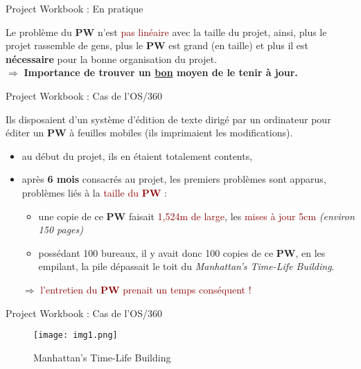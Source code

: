 \documentclass{beamer}
\newcommand{\red}[1]{\textcolor{darkred}{#1}}
\begin{document}
\begin{frame}{Project Workbook : En pratique}

Le problème du \textbf{PW} n'est \red{pas linéaire} avec la taille du projet, ainsi, plus le projet rassemble de gens, plus le 
\textbf{PW} est grand (en taille) et plus il est \textbf{nécessaire} pour la bonne organisation du projet.\\
$ $\\
$\Rightarrow$ \textbf{Importance de trouver un \underline{bon} moyen de le tenir à jour.}

\end{frame}

\begin{frame}{Project Workbook : Cas de l'OS/360}

Ils disposaient d'un système d'édition de texte dirigé par un ordinateur pour éditer un \textbf{PW} à feuilles mobiles (ils 
imprimaient les modifications). 
\begin{itemize}
\pause \item au début du projet, ils en étaient totalement contents,
\pause \item après \textbf{6 mois} consacrés au projet, les premiers problèmes sont apparus, problèmes liés à la \red{taille du 
\textbf{PW}} :
\begin{itemize}
\pause \item une copie de ce \textbf{PW} faisait \red{1,524m de large}, les \red{mises à jour 5cm} \textit{(environ 150 pages)}
\pause \item possédant 100 bureaux, il y avait donc 100 copies de ce \textbf{PW}, en les empilant, la pile dépassait le toit du
\textit{Manhattan's Time-Life Building}.
\end{itemize}
$\Rightarrow$ \red{l'entretien du \textbf{PW} prenait un temps conséquent !}
\end{itemize}

\end{frame}

\begin{frame}{Project Workbook : Cas de l'OS/360}

\begin{figure}
	\begin{center}
	\texttt{[image: img1.png]}
	\caption{Manhattan's Time-Life Building}
	\end{center}	
\end{figure}

\end{frame}
\end{document}
